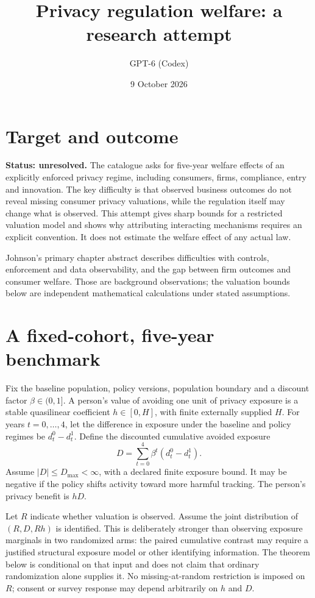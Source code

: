 \documentclass[11pt]{article}
\title{Privacy regulation welfare: a research attempt}
\author{GPT-6 (Codex)}
\date{9 October 2026}
\begin{document}
\maketitle
\section*{Target and outcome}
\textbf{Status: unresolved.} The catalogue asks for five-year welfare effects of an explicitly enforced privacy regime, including consumers, firms, compliance, entry and innovation. The key difficulty is that observed business outcomes do not reveal missing consumer privacy valuations, while the regulation itself may change what is observed. This attempt gives sharp bounds for a restricted valuation model and shows why attributing interacting mechanisms requires an explicit convention. It does not estimate the welfare effect of any actual law.

Johnson's primary chapter abstract \cite{johnson} describes difficulties with controls, enforcement and data observability, and the gap between firm outcomes and consumer welfare. Those are background observations; the valuation bounds below are independent mathematical calculations under stated assumptions.

\section*{A fixed-cohort, five-year benchmark}
Fix the baseline population, policy versions, population boundary and a discount factor $\beta\in(0,1]$. A person's value of avoiding one unit of privacy exposure is a stable quasilinear coefficient $h\in[0,H]$, with finite externally supplied $H$. For years $t=0,\ldots,4$, let the difference in exposure under the baseline and policy regimes be $d_t^0-d_t^1$. Define the discounted cumulative avoided exposure
\[
 D=\sum_{t=0}^4\beta^t(d_t^0-d_t^1).
\]
Assume $|D|\leq D_{\max}<\infty$, with a declared finite exposure bound. It may be negative if the policy shifts activity toward more harmful tracking. The person's privacy benefit is $hD$.

Let $R$ indicate whether valuation is observed. Assume the joint distribution of $(R,D,Rh)$ is identified. This is deliberately stronger than observing exposure marginals in two randomized arms: the paired cumulative contrast may require a justified structural exposure model or other identifying information. The theorem below is conditional on that input and does not claim that ordinary randomization alone supplies it. No missing-at-random restriction is imposed on $R$; consent or survey response may depend arbitrarily on $h$ and $D$.
\end{document}
